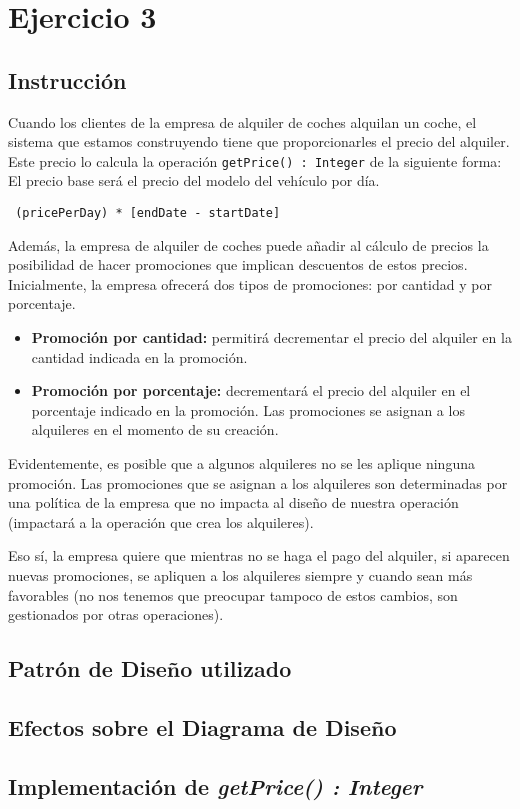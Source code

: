 \section{Ejercicio 3}
\subsection*{Instrucción}
Cuando los clientes de la empresa de alquiler de coches alquilan un coche, el sistema que estamos construyendo
tiene que proporcionarles el precio del alquiler. Este precio lo calcula la operación \texttt{getPrice() : Integer} de la siguiente
forma: El precio base será el precio del modelo del vehículo por día.
\begin{center}
    \texttt{ (pricePerDay) * [endDate - startDate]}
\end{center}
Además, la empresa de alquiler de coches puede añadir al cálculo de precios la posibilidad de hacer promociones
que implican descuentos de estos precios. Inicialmente, la empresa ofrecerá dos tipos de promociones: por cantidad
y por porcentaje.
\begin{itemize}
    \item \textbf{Promoción por cantidad:} permitirá decrementar el precio del alquiler en la cantidad indicada en
    la promoción.
    \item \textbf{Promoción por porcentaje:} decrementará el precio del alquiler en el porcentaje indicado en la
    promoción. Las promociones se asignan a los alquileres en el momento de su creación.
\end{itemize}
Evidentemente, es posible
que a algunos alquileres no se les aplique ninguna promoción. Las promociones que se asignan a los alquileres son
determinadas por una política de la empresa que no impacta al diseño de nuestra operación (impactará a la
operación que crea los alquileres).\par
\vspace{0.15cm}
Eso sí, la empresa quiere que mientras no se haga el pago del alquiler, si aparecen
nuevas promociones, se apliquen a los alquileres siempre y cuando sean más favorables (no nos tenemos que
preocupar tampoco de estos cambios, son gestionados por otras operaciones).


\subsection{Patrón de Diseño utilizado}


\subsection{Efectos sobre el Diagrama de Diseño}

\subsection{Implementación de \textit{getPrice() : Integer}}

\newpage

